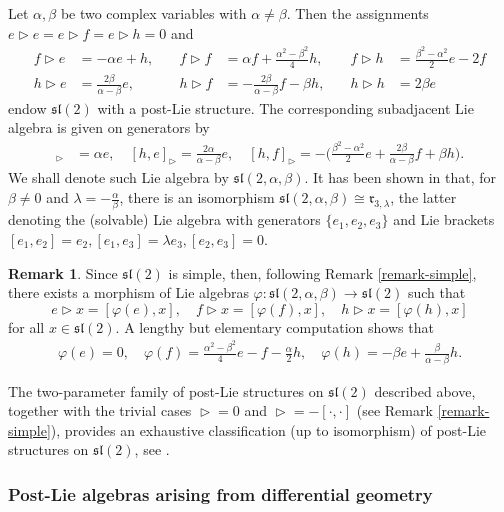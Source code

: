\documentclass[10pt]{article}
\theoremstyle{definition}
\newtheorem{remark}[lemma]{Remark}
\newcommand{\wt}{\vartriangleright}
\renewcommand{\r}{\mathfrak{r}}
\newcommand{\s}{\mathfrak{s}}
\renewcommand{\l}{\mathfrak{l}}
\begin{document}
Let $\alpha,\beta$ be two complex variables with $\alpha \neq \beta$. Then the assignments $e \wt e = e \wt f = e \wt h = 0 $ and
\begin{align*}
f \wt e &= - \alpha e + h, 
&\quad f \wt f &= \alpha f + \frac{\alpha^2 - \beta^2}{4} h, 
&\quad f \wt h &= \frac{\beta^2 - \alpha^2}{2} e - 2 f \\
h \wt e &= \frac{2\beta}{\alpha - \beta} e, 
&\quad h \wt f &= - \frac{2 \beta}{\alpha - \beta} f - \beta h, 
&\quad h \wt h &= 2 \beta e
\end{align*}
endow $\s\l(2)$ with a post-Lie structure.
The corresponding subadjacent Lie algebra is given on generators by 
\begin{align*}
[e,f]_\wt &= \alpha e,\quad 
[h,e]_\wt = \frac{2 \alpha}{\alpha - \beta} e,\quad
[h,f]_\wt = - \Big( \frac{\beta^2 - \alpha^2}{2} e + \frac{2 \beta}{\alpha - \beta} f + \beta h\Big).
\end{align*}
We shall denote such Lie algebra by $\s\l(2,\alpha,\beta)$. It has been shown in \cite{BDV} that, for $\beta \neq 0$ and $\lambda = - \frac{\alpha}{\beta}$, there is an isomorphism $\s\l(2,\alpha,\beta) \cong \r_{3,\lambda}$, the latter denoting the (solvable) Lie algebra with generators $\{ e_1,e_2,e_3\}$ and Lie brackets $[e_1,e_2] = e_2, [e_1,e_3] = \lambda
 e_3, [e_2,e_3] =0$.

\begin{remark}
Since $\s\l(2)$ is simple, then, following Remark \ref{remark-simple}, there exists a morphism of Lie algebras $\varphi: \s\l(2,\alpha,\beta) \to \s\l(2)$ such that
\[ e \wt x = [\varphi(e),x], \quad f \wt x = [\varphi(f),x], \quad h \wt x = [\varphi(h),x]\]
for all $x \in \s\l(2)$. A lengthy but elementary computation shows that 
\begin{align}
\label{eq:phi-sl2}
\varphi(e) = 0, \quad \varphi(f) = \frac{\alpha^2-\beta^2}{4} e -f- \frac{\alpha}{2} h, \quad \varphi(h) = -\beta e + \frac{\beta}{\alpha - \beta} h.
\end{align}
\end{remark}
The two-parameter family of post-Lie structures on $\s\l(2)$ described above, together with the trivial cases $\wt=0$ and $\wt = -[\cdot,\cdot]$ (see Remark \ref{remark-simple}), provides an exhaustive classification (up to isomorphism) of post-Lie structures on $\s\l(2)$, see \cite[Proposition 4.7]{BDV}.


\subsubsection{Post-Lie algebras arising from differential geometry}\label{sec:geompost}
\end{document}
